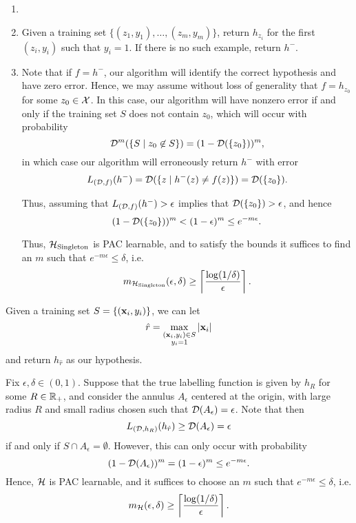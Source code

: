 \begin{ex}
  \begin{enumerate}
    \item[]
    \item Given a training set $\{(z_1, y_1), \ldots, (z_m, y_m)\}$,
          return $h_{z_i}$ for the first $(z_i, y_i)$ such that $y_i=1$.
          If there is no such example, return $h^-$.
    \item Note that if $f=h^-$, our algorithm will identify the correct
          hypothesis and have zero error. Hence, we may assume without loss of
          generality that $f=h_{z_0}$ for some $z_0\in\mathcal{X}$. In this case, our
          algorithm will have nonzero error if and only if the training set $S$
          does not contain $z_0$, which will occur with probability
          \[
            \mathcal{D}^m(\{S \mid z_0\not\in S\})
            =(1-\mathcal{D}(\{z_0\}))^m,
          \]
          in which case our algorithm will erroneously
          return $h^-$ with error
          \[
            L_{(\mathcal{D}, f)}(h^-)=\mathcal{D}(\{z \mid h^-(z) \neq f(z) \})=\mathcal{D}(\{z_0\}).
          \]

          Thus, assuming that $L_{(\mathcal{D}, f)}(h^-)>\epsilon$ implies that
          $\mathcal{D}(\{z_0\})>\epsilon$, and hence
          \[
            (1-\mathcal{D}(\{z_0\}))^m<(1-\epsilon)^m\leq e^{-m\epsilon}.
          \]

          Thus, $\mathcal{H}_\text{Singleton}$ is PAC learnable, and to satisfy the
          bounds it suffices to find an $m$ such that
          $e^{-m\epsilon}\leq\delta$, i.e.\
          \[
            m_{\mathcal{H}_\text{Singleton}}(\epsilon, \delta)
            \geq \left\lceil\frac{\log(1/\delta)}{\epsilon}\right\rceil.
          \]

  \end{enumerate}
\end{ex}

\begin{ex}
  Given a training set $S=\{(\mathbf{x}_i, y_i)\}$, we can let
  \[
    \hat{r}=\max_{\substack{(\mathbf{x}_i, y_i)\in S \\ y_i = 1}} |\mathbf{x}_i|
  \]
  and return $h_{\hat{r}}$ as our hypothesis.

  Fix $\epsilon, \delta\in (0,1)$. Suppose that the true labelling function is
  given by $h_R$ for some $R\in \mathbb{R}_+$, and consider the annulus $A_\epsilon$
  centered at the origin, with large radius $R$ and small radius chosen such
  that $\mathcal{D}(A_\epsilon)=\epsilon$. Note that then
  \[
    L_{(\mathcal{D}, h_R)}(h_{\hat{r}})\geq\mathcal{D}(A_\epsilon) =\epsilon
  \]
  if and only if $S\cap A_\epsilon=\emptyset$. However, this can only occur with
  probability
  \[
    (1-\mathcal{D}(A_\epsilon))^m=(1-\epsilon)^m\leq e^{-m\epsilon}.
  \]
  Hence, $\mathcal{H}$ is PAC learnable, and it suffices to choose an $m$ such
  that $e^{-m\epsilon}\leq \delta$, i.e.
  \[
    m_{\mathcal{H}}(\epsilon,\delta)
    \geq \left\lceil\frac{\log(1/\delta)}{\epsilon}\right\rceil.
  \]
\end{ex}

